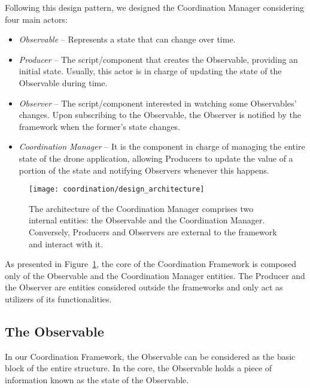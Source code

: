 Following this design pattern, we designed the Coordination Manager considering four main actors:
\begin{itemize}
    \item \textit{Observable} -- Represents a state that can change over time.  
    
    \item \textit{Producer} -- The script/component that creates the Observable, providing an initial state. 
    Usually, this actor is in charge of updating the state of the Observable during time.

    \item \textit{Observer} -- The script/component interested in watching some Observables' changes. 
    Upon subscribing to the Observable, the Observer is notified by the framework when the former's state changes.

    \item \textit{Coordination Manager} -- It is the component in charge of managing the entire state of the drone application, allowing Producers to update the value of a portion of the state and notifying Observers whenever this happens.
\end{itemize}


\begin{figure}[h]
    \centering
    \texttt{[image: coordination/design\_architecture]}
    \caption[The architecture of the Coordination Framework]{The architecture of the Coordination Manager comprises two internal entities: the Observable and the Coordination Manager. 
    Conversely, Producers and Observers are external to the framework and interact with it. }\label{fig:coordination_design_architecture}
\end{figure}

As presented in Figure~\ref{fig:coordination_design_architecture}, the core of the Coordination Framework is composed only of the Observable and the Coordination Manager entities.
The Producer and the Observer are entities considered outside the frameworks and only act as utilizers of its functionalities.

\subsection{The Observable}\label{subsec:observable}
In our Coordination Framework, the Observable can be considered as the basic block of the entire structure.
In the core, the Observable holds a piece of information known as the state of the Observable. 

